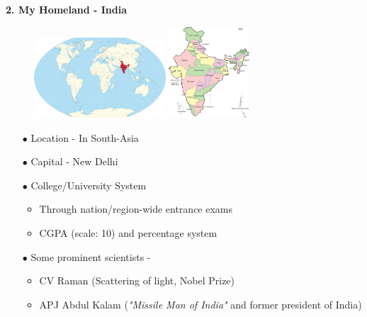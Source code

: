 \documentclass[mathserif,9pt]{beamer}
\begin{document}
\begin{frame}
\small{

\textcolor{b_bruz}{\Large{\bf 2. My Homeland - India}}

\begin{figure}[!tbp]
  \centering
  \begin{minipage}[b]{0.4\textwidth}
    \centering
    \includegraphics[height=3cm]{images/india-on-world-map.jpg}
  \end{minipage}
  \hfill
  \begin{minipage}[b]{0.4\textwidth}
    \centering
    \includegraphics[width=3cm]{images/India-map-en.png}
  \end{minipage}
\end{figure}
\bigskip

\begin{itemize}
    \item[$\bullet$] Location - In South-Asia
    \item[$\bullet$] Capital - New Delhi
    \item[$\bullet$] College/University System
        \begin{itemize}
            \item Through nation/region-wide entrance exams
            \item CGPA (scale: 10) and percentage system
        \end{itemize}
    \item[$\bullet$] Some prominent scientists - 
        \begin{itemize}
            \item CV Raman (Scattering of light, Nobel Prize)
            \item APJ Abdul Kalam (\textit{"Missile Man of India"} and former president of India)
        \end{itemize}
    
\end{itemize}



}
\end{frame}
\end{document}
